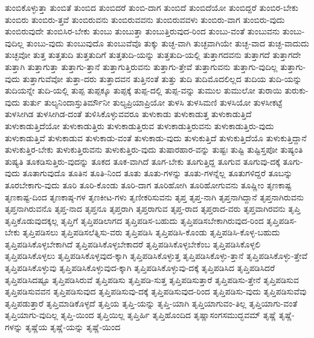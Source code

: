 {ತುಂಬಿಕೊಳ್ಳುತ್ತಾ
ತುಂಬಿತೆ
ತುಂಬಿದ
ತುಂಬಿದರೆ
ತುಂಬಿ-ದಾಗ
ತುಂಬಿದೆ
ತುಂಬಿದೆಯೋ
ತುಂಬಿದ್ದರೆ
ತುಂಬಿರ-ಬೇಕು
ತುಂಬಿರು
ತುಂಬಿರು-ತ್ತವೆ
ತುಂಬಿರುವನು
ತುಂಬಿರುವವನು
ತುಂಬಿರುವವಳು
ತುಂಬಿರು-ವಾಗ
ತುಂಬಿರು-ವುದು
ತುಂಬಿರುವುದೇ
ತುಂಬಿಸಿರ-ಬೇಕು
ತುಂಬು
ತುಂಬುತ್ತಾ
ತುಂಬುತ್ತಿರುವುದ-ರಿಂದ
ತುಂಬು-ವಂತೆ
ತುಂಬುವನು
ತುಂಬು-ವುದಿಲ್ಲ
ತುಂಬು-ವುದು
ತುಂಬುವುದೊ
ತುಂಬುವೆವೊ
ತುಕ್ಕು
ತುಚ್ಛ-ವಾಗಿ
ತುಚ್ಛವಾಗಿಯೇ
ತುಚ್ಛ-ವಾದ
ತುಚ್ಛ-ವಾದುದು
ತುಚ್ಛವೋ
ತುತ್ತ
ತುತ್ತತುದಿ
ತುತ್ತತುದಿಗೆ
ತುತ್ತತುದಿ-ಯನ್ನು
ತುತ್ತತುದಿ-ಯಲ್ಲಿ
ತುತ್ತಾಗದವನು
ತುತ್ತಾಗದೆ
ತುತ್ತಾಗದೇ
ತುತ್ತಾಗಿ
ತುತ್ತಾಗುತ್ತಾ
ತುತ್ತಾಗು-ತ್ತಾನೆ
ತುತ್ತಾಗುತ್ತಿರುವನು
ತುತ್ತಾಗು-ತ್ತೇವೆ
ತುತ್ತಾಗುವನು
ತುತ್ತಾಗು-ವುದಿಲ್ಲ
ತುತ್ತಾಗು-ವುದು
ತುತ್ತಾಗುವೆವೋ
ತುತ್ತಾ-ದರು
ತುತ್ತಾದವನ
ತುತ್ತಿನಂತೆ
ತುತ್ತು
ತುದಿ
ತುದಿಮೊದಲಿಲ್ಲದ
ತುದಿಯ
ತುದಿ-ಯನ್ನು
ತುದಿಯನ್ನೇ
ತುದಿ-ಯಲ್ಲಿ
ತುಪ್ಪ
ತುಪ್ಪಕ್ಕೂ
ತುಪ್ಪಕ್ಕೆ
ತುಪ್ಪ-ದಲ್ಲಿ
ತುಪ್ಪ-ವನ್ನು
ತುಮುಲ
ತುಮುಲೋ
ತುರಾಯಿ
ತುರುಕು-ವುದು
ತುರ್ತು
ತುಲ್ಯನಿಂದಾಸ್ತುತಿರ್ಮೌನೀ
ತುಲ್ಯಪ್ರಿಯಾಪ್ರಿಯೋ
ತುಳಸಿ
ತುಳಸಿಮಣಿ
ತುಳಸಿಯೋ
ತುಳಸೀಕಟ್ಟೆ
ತುಳಸೀಗಿಡ
ತುಳಸೀಗಿಡ-ದಂತೆ
ತುಳಿಸಿಕೊಳ್ಳುವವರೂ
ತುಳುಕಾಡು
ತುಳುಕಾಡುತ್ತ
ತುಳುಕಾಡುತ್ತಿದೆ
ತುಳುಕಾಡುತ್ತಿದೆಯೋ
ತುಳುಕಾಡುತ್ತಿರು
ತುಳುಕಾಡುತ್ತಿರುವ
ತುಳುಕಾಡುತ್ತಿರುವನು
ತುಳುಕಾಡುತ್ತಿರು-ವುದು
ತುಳುಕಾಡುತ್ತಿವೆ
ತುಳುಕಾಡುವ
ತುಳುಕಾಡು-ವಂತೆ
ತುಳುಕಾಡು-ವುದು
ತುಳುಕುತ್ತಿದೆ
ತುಳುಕುತ್ತಿದೆಯೊ
ತುಳುಕುತ್ತಿದ್ದಾನೆ
ತುಳುಕುತ್ತಿರ-ಬೇಕು
ತುಳುಕುತ್ತಿರುವನು
ತುಳುಕುತ್ತಿರು-ವುದು
ತುಷಾರಹಾರ-ವನ್ನು
ತುಷ್ಟಃ
ತುಷ್ಟಿ
ತುಷ್ಟಿಸ್ತಪೋ
ತುಷ್ಯಂತಿ
ತುಷ್ಯತಿ
ತೂಕಡಿಸುತ್ತಿರು-ವುದನ್ನು
ತೂಕದ
ತೂಕ-ವಾಗಿದೆ
ತೂಗ-ಬೇಕು
ತೂಗುತ್ತಿದ್ದ
ತೂಗುವ
ತೂಗುವು-ದಕ್ಕೆ
ತೂಗು-ವುದು
ತೂತಾಗುವುದೊ
ತೂತಿನ
ತೂತಿ-ನಿಂದ
ತೂತು
ತೂತು-ಗಳನ್ನು
ತೂತು-ಗಳನ್ನೆಲ್ಲ
ತೂತುಗಳಿದ್ದರೆ
ತೂಬನ್ನು
ತೂರಬೇಕಾಗು-ವುದು
ತೂರಿ
ತೂರಿ-ಕೊಂಡು
ತೂರಿ-ದಾಗ
ತೂರಿಹೋಗಿ
ತೂರಿಹೋಗುವನು
ತೂಷ್ಣೀಂ
ತೃಣಕಾಷ್ಟ
ತೃಣಕಾಷ್ಟ-ದಿಂದ
ತೃಣಕಾಷ್ಠ-ಗಳ
ತೃಣಕೀಟ-ಗಳು
ತೃಣೀಕರಿಸುವನು
ತೃಪ್ತ
ತೃಪ್ತ-ನಾಗಿ
ತೃಪ್ತನಾಗಿದ್ದಾನೆ
ತೃಪ್ತನಾಗಿರುವನು
ತೃಪ್ತನಾಗಿರುವನೊ
ತೃಪ್ತ-ನಾದ
ತೃಪ್ತನೂ
ತೃಪ್ತರಾಗಿ
ತೃಪ್ತರಾಗುವ
ತೃಪ್ತ-ರಾದ
ತೃಪ್ತರಾದ-ವರು
ತೃಪ್ತವಾಗಿರವನು
ತೃಪ್ತಿ
ತೃಪ್ತಿಕೊಡುವುದಕ್ಕಲ್ಲ
ತೃಪ್ತಿಗೆ
ತೃಪ್ತಿಪಡಿಲಾಗದ
ತೃಪ್ತಿಪಡಿಸ-ಬಹುದು
ತೃಪ್ತಿಪಡಿಸಬೇಕಾಗಿರುವುದ-ರಿಂದ
ತೃಪ್ತಿಪಡಿಸ-ಬೇಕು
ತೃಪ್ತಿಪಡಿಸಲು
ತೃಪ್ತಿಪಡಿಸಲೆತ್ನಿಸು-ವರು
ತೃಪ್ತಿಪಡಿಸಿ
ತೃಪ್ತಿಪಡಿಸಿ-ಕೊಂಡು
ತೃಪ್ತಿಪಡಿಸಿ-ಕೊಳ್ಳ-ಬಹುದು
ತೃಪ್ತಿಪಡಿಸಿಕೊಳ್ಳಬೇಕಾಗಿದೆ
ತೃಪ್ತಿಪಡಿಸಿಕೊಳ್ಳಬೇಕಾದರೆ
ತೃಪ್ತಿಪಡಿಸಿಕೊಳ್ಳಬೇಕೆಂಬ
ತೃಪ್ತಿಪಡಿಸಿಕೊಳ್ಳಲಿ
ತೃಪ್ತಿಪಡಿಸಿಕೊಳ್ಳಲು
ತೃಪ್ತಿಪಡಿಸಿಕೊಳ್ಳವುದ-ಕ್ಕಾಗಿ
ತೃಪ್ತಿಪಡಿಸಿಕೊಳ್ಳುತ್ತ
ತೃಪ್ತಿಪಡಿಸಿಕೊಳ್ಳು-ತ್ತಾನೆ
ತೃಪ್ತಿಪಡಿಸಿಕೊಳ್ಳು-ತ್ತೇವೆ
ತೃಪ್ತಿಪಡಿಸಿಕೊಳ್ಳುವು
ತೃಪ್ತಿಪಡಿಸಿಕೊಳ್ಳುವುದ-ಕ್ಕಾಗಿ
ತೃಪ್ತಿಪಡಿಸಿಕೊಳ್ಳುವು-ದಕ್ಕೆ
ತೃಪ್ತಿಪಡಿಸಿದ
ತೃಪ್ತಿಪಡಿಸಿದರೆ
ತೃಪ್ತಿಪಡಿಸಿದಷ್ಟೂ
ತೃಪ್ತಿಪಡಿಸಿರುವೆ
ತೃಪ್ತಿಪಡಿಸು
ತೃಪ್ತಿಪಡಿ-ಸುತ್ತ
ತೃಪ್ತಿಪಡಿಸುತ್ತಾರೆ
ತೃಪ್ತಿಪಡಿಸು-ತ್ತೇನೆ
ತೃಪ್ತಿಪಡಿಸುವ
ತೃಪ್ತಿಪಡಿಸುವವನ
ತೃಪ್ತಿಪಡಿಸುವುದ
ತೃಪ್ತಿಪಡಿಸುವು-ದಕ್ಕೆ
ತೃಪ್ತಿಪಡಿಸುವುದ-ರಿಂದ
ತೃಪ್ತಿಪಡಿಸು-ವುದು
ತೃಪ್ತಿಪಡಿಸುವೆವು
ತೃಪ್ತಿಪಡುತ್ತಾರೆ
ತೃಪ್ತಿಮಾಡಿಕೊಳ್ಳದೆ
ತೃಪ್ತಿಯ
ತೃಪ್ತಿ-ಯನ್ನು
ತೃಪ್ತಿ-ಯಾಗಿ
ತೃಪ್ತಿಯಾಗುವಂ-ತಿಲ್ಲ
ತೃಪ್ತಿಯಾಗು-ವಂತೆ
ತೃಪ್ತಿಯಾಗು-ವುದಿಲ್ಲ
ತೃಪ್ತಿ-ಯಿಂದ
ತೃಪ್ತಿಯಿಲ್ಲ
ತೃಪ್ತಿರ್ಹಿ
ತೃಪ್ತಿಹೊಂದಿದ
ತೃಷ್ಣಾಸಂಗಸಮುದ್ಭವಮ್
ತೃಷ್ಣೆ
ತೃಷ್ಣೆ-ಗಳನ್ನು
ತೃಷ್ಣೆಯ
ತೃಷ್ಣೆ-ಯನ್ನು
ತೃಷ್ಣೆ-ಯಿಂದ
}
